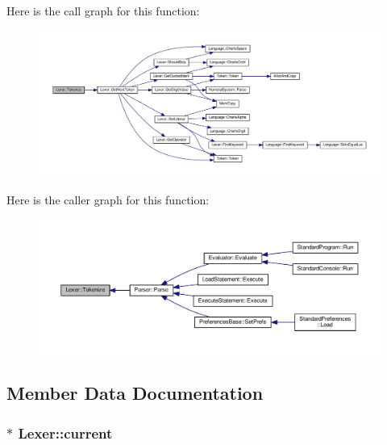 Here is the call graph for this function\+:\nopagebreak
\begin{figure}[H]
\begin{center}
\leavevmode
\includegraphics[width=350pt]{classLexer_a02696cb1f974ae74116c2b746dcba365_cgraph}
\end{center}
\end{figure}




Here is the caller graph for this function\+:\nopagebreak
\begin{figure}[H]
\begin{center}
\leavevmode
\includegraphics[width=350pt]{classLexer_a02696cb1f974ae74116c2b746dcba365_icgraph}
\end{center}
\end{figure}




\subsection{Member Data Documentation}
\subsubsection[{\texorpdfstring{current}{current}}]{$\ast$ Lexer\+::current\hspace{0.3cm}{\ttfamily [private]}}\hypertarget{classLexer_a64f66ae0d280ab2d4f4b8e2ac5d8c4c5}{}\label{classLexer_a64f66ae0d280ab2d4f4b8e2ac5d8c4c5}


